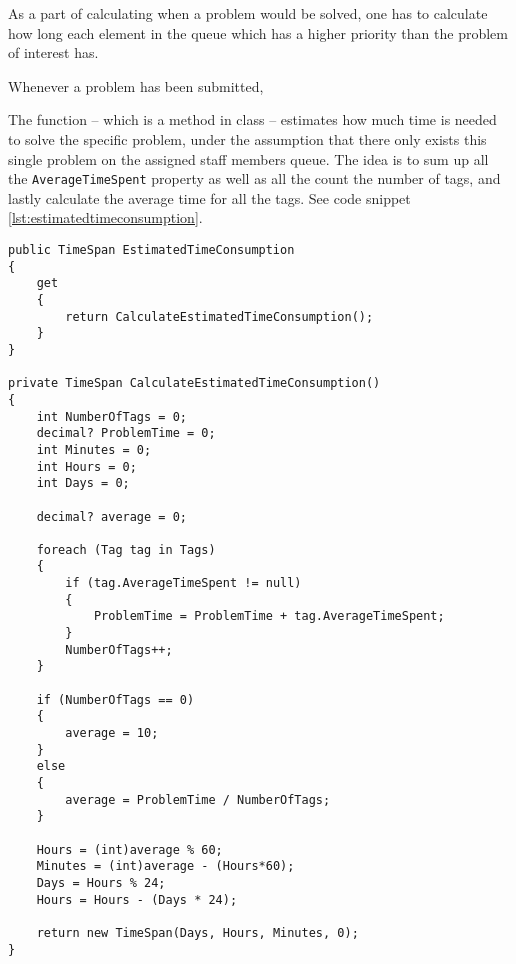 \label{sec:estimated_time_consumption}

As a part of calculating when a problem would be solved, one has to calculate how long each element in the queue which has a higher priority than the problem of interest has.

Whenever a problem has been submitted,

The  function -- which is a method in  class -- estimates how much time is needed to solve the specific problem, under the assumption that there only exists this single problem on the assigned staff members queue. The idea is to sum up all the \verb+AverageTimeSpent+ property as well as all the count the number of tags, and lastly calculate the average time for all the tags. See code snippet \ref{lst:estimatedtimeconsumption}.

\begin{lstlisting}[style=sourceCode, caption=\myCaption{The ManageTagTimes method}, label=lst:estimatedtimeconsumption]
public TimeSpan EstimatedTimeConsumption
{
    get
    {
        return CalculateEstimatedTimeConsumption();
    }
}

private TimeSpan CalculateEstimatedTimeConsumption()
{
    int NumberOfTags = 0;
    decimal? ProblemTime = 0;
    int Minutes = 0;
    int Hours = 0;
    int Days = 0;

    decimal? average = 0;

    foreach (Tag tag in Tags)
    {
        if (tag.AverageTimeSpent != null)
        {
            ProblemTime = ProblemTime + tag.AverageTimeSpent;
        }
        NumberOfTags++;
    }

    if (NumberOfTags == 0)
    {
        average = 10;
    }
    else
    {
        average = ProblemTime / NumberOfTags;
    }

    Hours = (int)average % 60;
    Minutes = (int)average - (Hours*60);
    Days = Hours % 24;
    Hours = Hours - (Days * 24);

    return new TimeSpan(Days, Hours, Minutes, 0);
}
\end{lstlisting}